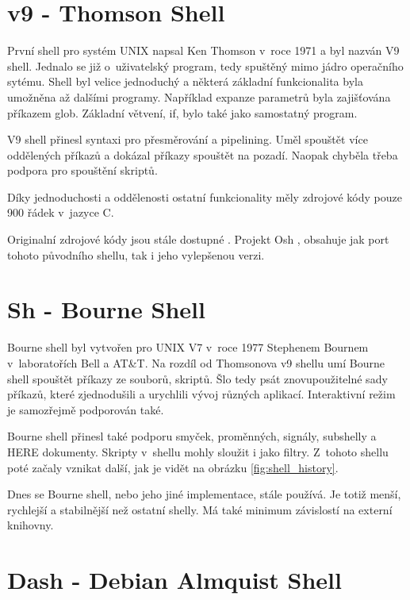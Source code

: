 \documentclass[thesis=M,czech]{FITthesis}[2012/06/26]
\begin{document}
\section{v9 - Thomson Shell}

První shell pro systém UNIX napsal Ken Thomson v~roce 1971 a byl nazván V9 shell. Jednalo se již o~uživatelský program, tedy spuštěný mimo jádro operačního sytému. Shell byl velice jednoduchý a některá základní funkcionalita byla umožněna až dalšími programy. Například expanze parametrů byla zajišťována příkazem glob. Základní větvení, if, bylo také jako samostatný program.

V9 shell přinesl syntaxi pro přesměrování a pipelining. Uměl spouštět více oddělených příkazů a dokázal příkazy spouštět na pozadí. Naopak chyběla třeba podpora pro spouštění skriptů.

Díky jednoduchosti a oddělenosti ostatní funkcionality měly zdrojové kódy pouze 900 řádek v~jazyce C.

Originalní zdrojové kódy jsou stále dostupné \cite{thompsonshell}. Projekt Osh \cite{v6shell}, obsahuje jak port tohoto původního shellu, tak i jeho vylepšenou verzi.



%
%
%
\section{Sh - Bourne Shell}

Bourne shell byl vytvořen pro UNIX V7 v~roce 1977 Stephenem Bournem v~laboratořích Bell a AT\&T. Na rozdíl od Thomsonova v9 shellu umí Bourne shell spouštět příkazy ze souborů, skriptů. Šlo tedy psát znovupoužitelné sady příkazů, které zjednodušili a urychlili vývoj různých aplikací. Interaktivní režim je samozřejmě podporován také.

Bourne shell přinesl také podporu smyček, proměnných, signály, subshelly a HERE dokumenty. Skripty v~shellu mohly sloužit i jako filtry. Z~tohoto shellu poté začaly vznikat další, jak je vidět na obrázku \ref{fig:shell_history}.

Dnes se Bourne shell, nebo jeho jiné implementace, stále používá. Je totiž menší, rychlejší a stabilnější než ostatní shelly. Má také minimum závislostí na externí knihovny.

%
%
%
\section{Dash - Debian Almquist Shell}
\end{document}
